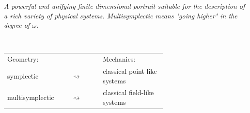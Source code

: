\documentclass[beamer,handout,10pt]{standalone}
\begin{document}
\begin{frame}
		\vspace{-.5em}
		\centering
		\parbox{0.98\linewidth}{%
		\emph{
			A powerful and unifying finite dimensional portrait suitable for the description of a rich variety of physical systems.
		Multisymplectic means \emph{"going higher"} in the degree of $\omega$.
		}
		}
		\\
		\begin{center}\begin{tabular}{p{0.2\linewidth} p{0.15\linewidth} p{0.3\linewidth}}
		Geometry: & & Mechanics: \\
		symplectic &\centering $\rightsquigarrow$ & classical point-like systems \\
		multisymplectic &\centering $\rightsquigarrow$ & classical field-like systems
		\end{tabular}\end{center}

\end{frame}
\end{document}
